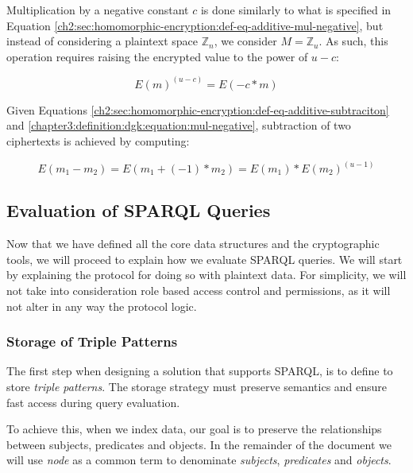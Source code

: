 \begin{definition}
    Multiplication by a negative constant $c$ is done similarly to what is specified in Equation \ref{ch2:sec:homomorphic-encryption:def-eq-additive-mul-negative}, but instead of considering a plaintext space $\mathbb{Z}_n$, we consider $M = \mathbb{Z}_u$. As such, this operation requires raising the encrypted value to the power of $u - c$:

    \begin{equation}\label{chapter3:definition:dgk:equation:mul-negative}
        E(m)^{(u - c)} = E(-c*m)
    \end{equation}

    Given Equations \ref{ch2:sec:homomorphic-encryption:def-eq-additive-subtraciton} and \ref{chapter3:definition:dgk:equation:mul-negative}, subtraction of two ciphertexts is achieved by computing:

    \begin{equation}
        E(m_1 - m_2) = E(m_1 + (-1) * m_2) = E(m_1) * E(m_2)^{(u - 1)}
    \end{equation}

\end{definition}

\subsection{Evaluation of SPARQL Queries}

Now that we have defined all the core data structures and the cryptographic tools, we will proceed to explain how we evaluate \gls{SPARQL} queries. We will start by explaining the protocol for doing so with plaintext data. For simplicity, we will not take into consideration role based access control and permissions, as it will not alter in any way the protocol logic.

\subsubsection{Storage of Triple Patterns}

The first step when designing a solution that supports \gls{SPARQL}, is to define to store \emph{triple patterns}. The storage strategy must preserve semantics and ensure fast access during query evaluation.

To achieve this, when we index data, our goal is to preserve the relationships between subjects, predicates and objects. In the remainder of the document we will use \emph{node} as a common term to denominate \emph{subjects}, \emph{predicates} and \emph{objects}.

